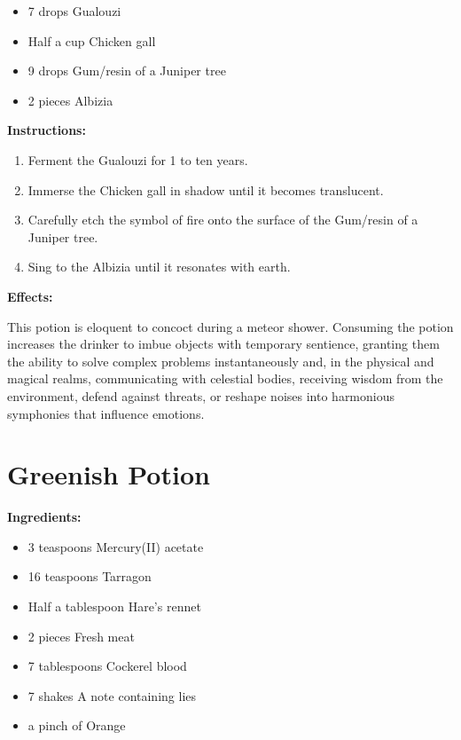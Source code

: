 \documentclass{article}
\begin{document}
\begin{itemize}
  \item 7 drops Gualouzi
  \item Half a cup Chicken gall
  \item 9 drops Gum/resin  of a Juniper tree
  \item 2 pieces Albizia
\end{itemize}

\textbf{Instructions:}

\begin{enumerate}
  \item Ferment the Gualouzi for 1 to ten years.
  \item Immerse the Chicken gall in shadow until it becomes translucent.
  \item Carefully etch the symbol of fire onto the surface of the Gum/resin  of a Juniper tree.
  \item Sing to the Albizia until it resonates with earth.
\end{enumerate}

\textbf{Effects:}

This potion is eloquent to concoct during a meteor shower. Consuming the potion increases the drinker to imbue objects with temporary sentience, granting them the ability to solve complex problems instantaneously and, in the physical and magical realms, communicating with celestial bodies, receiving wisdom from the environment, defend against threats, or reshape noises into harmonious symphonies that influence emotions.

\newpage
\section*{Greenish Potion}

\textbf{Ingredients:}

\begin{itemize}
  \item 3 teaspoons Mercury(II) acetate
  \item 16 teaspoons Tarragon
  \item Half a tablespoon Hare's rennet
  \item 2 pieces Fresh meat
  \item 7 tablespoons Cockerel blood
  \item 7 shakes A note containing lies
  \item a pinch of Orange
\end{itemize}
\end{document}
